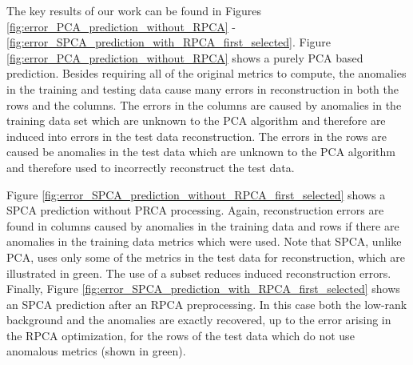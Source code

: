 \documentclass[conference]{IEEEtran}
\begin{document}
The key results of our work can be found in Figures \ref{fig:error_PCA_prediction_without_RPCA} -  
\ref{fig:error_SPCA_prediction_with_RPCA_first_selected}.
Figure \ref{fig:error_PCA_prediction_without_RPCA} shows a purely PCA based prediction.  Besides requiring all of the original metrics to compute, the anomalies in the training and testing data cause many errors in reconstruction in both the rows and the columns.  The errors in the columns are caused by anomalies in the training data set which are unknown to the PCA algorithm and therefore are induced into errors in the test data reconstruction.  The errors in the rows are caused be anomalies in the test data which are unknown to the PCA algorithm and therefore used to incorrectly reconstruct the test data.  %

Figure \ref{fig:error_SPCA_prediction_without_RPCA_first_selected} shows a SPCA prediction without PRCA processing.  Again, reconstruction errors are found in columns caused by anomalies in the training data and rows if there are anomalies in the training data metrics which were used.  Note that SPCA, unlike PCA, uses only some of the metrics in the test data for reconstruction, which are illustrated in green. The use of a subset reduces induced reconstruction errors.
Finally, Figure \ref{fig:error_SPCA_prediction_with_RPCA_first_selected} shows an SPCA prediction after an RPCA preprocessing.  In this case both the low-rank background and the anomalies are exactly recovered, up to the error arising in the RPCA optimization, for the rows of the test data which do not use anomalous metrics (shown in green).
\end{document}
